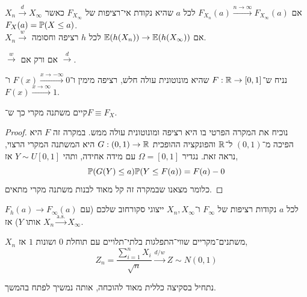 \begin{definition}
	$X_n \xrightarrow{d} X_\infty$ אם $F_{X_n}(a) \xrightarrow{n \to \infty} F_{X_\infty}(a)$ לכל $a$ שהיא נקודת אי־רציפות של $F_{X_\infty}$ כאשר $F_X(a) = \mathbb{P}(X \le a)$. \\
	$X_n \xrightarrow{w}$ אם $\mathbb{E}(h(X_n)) \to \mathbb{E}(h(X_\infty))$ לכל $h$ רציפה וחסומה.
\end{definition}
\begin{proposition}
	$\xrightarrow{w}$ אם ורק אם $\xrightarrow{d}$.
\end{proposition}
\begin{definition}
	נניח ש־$F : \mathbb{R} \to [0, 1]$ שהיא מונוטונית עולה חלש, רציפה מימין ו־$F(x) \xrightarrow{x \to -\infty} 0$ ו־$F(x) \xrightarrow{x \to \infty} 1$.
\end{definition}
\begin{proposition}
	קיים משתנה מקרי כך ש־$F \equiv F_X$.
\end{proposition}
\begin{proof}
	נוכיח את המקרה הפרטי בו היא רציפה ומונוטונית עולה ממש.
	במקרה זה $F$ היא הפיכה מ־$(0, 1)$ ל־$\mathbb{R}$ והפונקציה ההופכית $G : (0, 1) \to \mathbb{R}$ היא המשתנה המקרי הרצוי, נראה זאת.
	נגדיר $\Omega = [0, 1]$ עם מידה אחידה, ותהי $Y \sim U[0, 1]$ אז,
	\[
		\mathbb{P}(G(Y) \le a)
		\mathbb{P}(Y \le F(a))
		= F(a) - 0
	\]
	כלומר מצאנו שבמקרה זה קל מאוד לבנות משתנה מקרי מתאים.
\end{proof}
\begin{proposition}
	$F_h(a) \to F_\infty(a)$ לכל $a$ נקודות רציפות של $F_\infty$ ו־$X_n, X_\infty$ ייצוגי סקורחוב שלכם (עם אותו $Y$) אז $X_n \xrightarrow{\text{a.s.}} X_\infty$.
\end{proposition}
\begin{theorem}
	$X_n$ משתנים־מקריים שווי־התפלגות בלתי־תלויים עם תוחלת $0$ ושונות $1$ אז,
	\[
		Z_n
		= \frac{\sum_{i = 1}^n X_i}{\sqrt{n}}
		\xrightarrow{d / w}
		Z \sim N(0, 1)
	\]
\end{theorem}
נתחיל בסקיצה כללית מאוד להוכחה, אותה נמשיך לפתח בהמשך.
